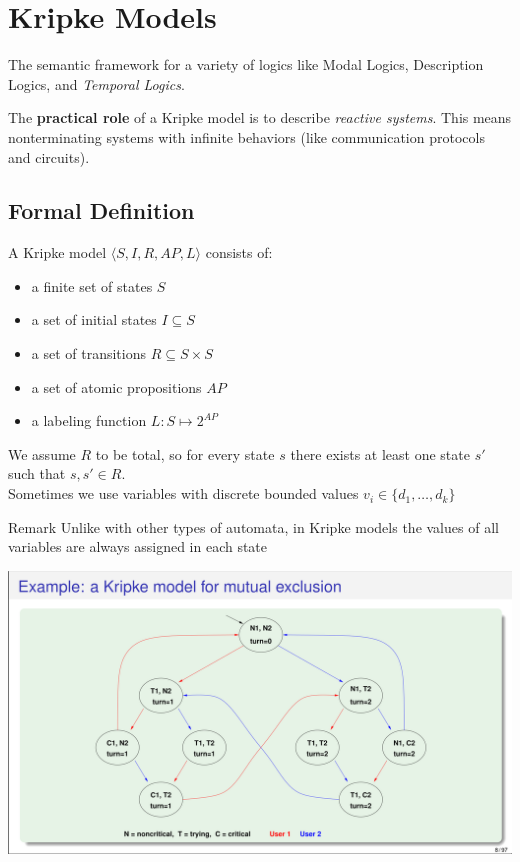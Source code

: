 \documentclass{article}
\begin{document}
\section{Kripke Models}
The semantic framework for a variety of logics like Modal Logics, Description Logics, and \textit{Temporal Logics}.

The \textbf{practical role} of a Kripke model is to describe \textit{reactive systems}. This means nonterminating systems with infinite behaviors (like communication protocols and circuits).

\subsection{Formal Definition}
A Kripke model $\langle S, I, R, AP, L\rangle$ consists of:
\begin{itemize}
    \item a finite set of states $S$
    \item a set of initial states $I \subseteq S$
    \item a set of transitions $R\subseteq S\times S$
    \item a set of atomic propositions $AP$
    \item a labeling function $L: S\mapsto 2^{AP}$
\end{itemize}

We assume $R$ to be total, so for every state $s$ there exists at least one state $s'$ such that $s,s'\in R$.\\
Sometimes we use variables with discrete bounded values $v_i\in\{d_1,\dots,d_k\}$

\begin{callout}{Remark}
    Unlike with other types of automata, in Kripke models the values of all variables are always assigned in each state
\end{callout}

\begin{center}
    \includegraphics[width=1\linewidth]{images/kripke_example.png}
\end{center}
\end{document}
